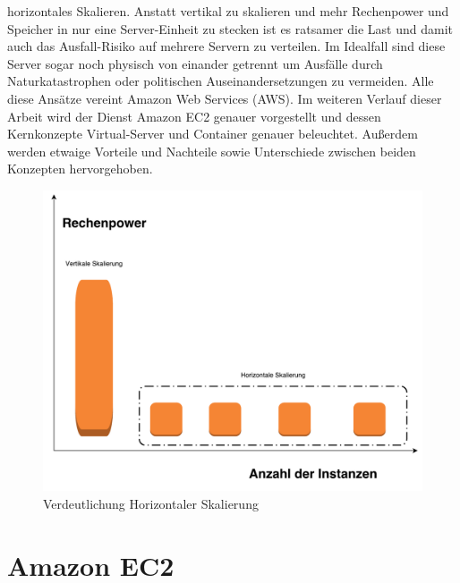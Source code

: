 \documentclass[titlepage]{report}
\begin{document}
horizontales Skalieren. Anstatt vertikal zu skalieren und mehr
Rechenpower und Speicher in nur eine Server-Einheit zu stecken ist es
ratsamer die Last und damit auch das Ausfall-Risiko auf mehrere Servern
zu verteilen. Im Idealfall sind diese Server sogar noch physisch von
einander getrennt um Ausfälle durch Naturkatastrophen oder politischen
Auseinandersetzungen zu vermeiden.  Alle diese Ansätze vereint Amazon
Web Services (AWS). Im weiteren Verlauf dieser Arbeit wird der Dienst
Amazon EC2 genauer vorgestellt und dessen Kernkonzepte Virtual-Server
und Container genauer beleuchtet. Außerdem werden etwaige Vorteile und
Nachteile sowie Unterschiede zwischen beiden Konzepten hervorgehoben.
\begin{figure}
    \centering
    \includegraphics[width=1.0\textwidth]{figures/scalability.pdf}
    \caption{Verdeutlichung Horizontaler Skalierung}\label{fig:1}
\end{figure}
\chapter*{Amazon EC2}
\end{document}
